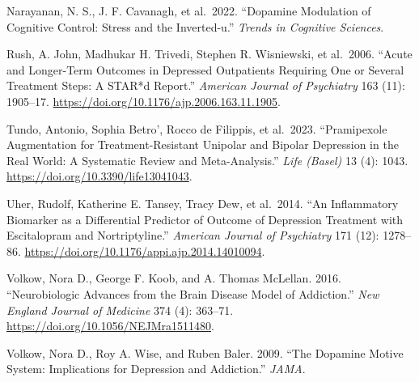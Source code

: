 Narayanan, N. S., J. F. Cavanagh, et al.~2022. ``Dopamine Modulation of Cognitive Control: Stress and the Inverted-u.'' \emph{Trends in Cognitive Sciences}.

Rush, A. John, Madhukar H. Trivedi, Stephen R. Wisniewski, et al.~2006. ``Acute and Longer-Term Outcomes in Depressed Outpatients Requiring One or Several Treatment Steps: A STAR*d Report.'' \emph{American Journal of Psychiatry} 163 (11): 1905--17. \url{https://doi.org/10.1176/ajp.2006.163.11.1905}.

Tundo, Antonio, Sophia Betro', Rocco de Filippis, et al.~2023. ``Pramipexole Augmentation for Treatment-Resistant Unipolar and Bipolar Depression in the Real World: A Systematic Review and Meta-Analysis.'' \emph{Life (Basel)} 13 (4): 1043. \url{https://doi.org/10.3390/life13041043}.

Uher, Rudolf, Katherine E. Tansey, Tracy Dew, et al.~2014. ``An Inflammatory Biomarker as a Differential Predictor of Outcome of Depression Treatment with Escitalopram and Nortriptyline.'' \emph{American Journal of Psychiatry} 171 (12): 1278--86. \url{https://doi.org/10.1176/appi.ajp.2014.14010094}.

Volkow, Nora D., George F. Koob, and A. Thomas McLellan. 2016. ``Neurobiologic Advances from the Brain Disease Model of Addiction.'' \emph{New England Journal of Medicine} 374 (4): 363--71. \url{https://doi.org/10.1056/NEJMra1511480}.

Volkow, Nora D., Roy A. Wise, and Ruben Baler. 2009. ``The Dopamine Motive System: Implications for Depression and Addiction.'' \emph{JAMA}.
